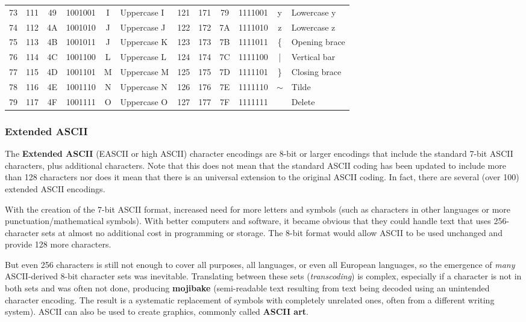 \documentclass{article}
\begin{document}
{\begin{tabular}{ |c|c|c|c|c|l|c|c|c|c|c|l| }
  73 & 111 & 49& 1001001 &I&Uppercase I & 121 & 171 & 79& 1111001 &y&Lowercase y\\
  74 & 112 & 4A& 1001010 &J&Uppercase J & 122 & 172 & 7A& 1111010 &z&Lowercase z\\
  75 & 113 & 4B& 1001011 &J&Uppercase K & 123 & 173 & 7B& 1111011 &\{& Opening brace\\
  76 & 114 & 4C& 1001100 &L&Uppercase L & 124 & 174 & 7C& 1111100 &|& Vertical bar\\
  77 & 115 & 4D& 1001101 &M&Uppercase M & 125 & 175 & 7D& 1111101 &\}& Closing brace\\
  78 & 116 & 4E& 1001110 &N&Uppercase N & 126 & 176 & 7E& 1111110 & $\sim$ & Tilde\\
  79 & 117 & 4F& 1001111 &O&Uppercase O & 127 & 177 & 7F& 1111111 & & Delete\\
   \hline
  \end{tabular}}

  \subsubsection{Extended ASCII}
  The \textbf{Extended ASCII} (EASCII or high ASCII) character encodings are 8-bit or larger encodings that include the standard 7-bit ASCII characters, plus additional characters. Note that this does not mean that the standard ASCII coding has been updated to include more than 128 characters nor does it mean that there is an universal extension to the original ASCII coding. In fact, there are several (over 100) extended ASCII encodings. 

  With the creation of the 7-bit ASCII format, increased need for more letters and symbols (such as characters in other languages or more punctuation/mathematical symbols). With better computers and software, it became obvious that they could handle text that uses 256-character sets at almost no additional cost in programming or storage. The 8-bit format would allow ASCII to be used unchanged and provide 128 more characters. 

  But even 256 characters is still not enough to cover all purposes, all languages, or even all European languages, so the emergence of \textit{many} ASCII-derived 8-bit character sets was inevitable. Translating between these sets (\textit{transcoding}) is complex, especially if a character is not in both sets and was often not done, producing \textbf{mojibake} (semi-readable text resulting from text being decoded using an unintended character encoding. The result is a systematic replacement of symbols with completely unrelated ones, often from a different writing system). ASCII can also be used to create graphics, commonly called \textbf{ASCII art}. 
\end{document}
